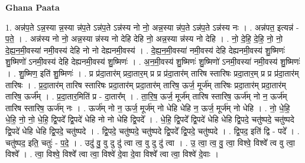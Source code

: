 \documentclass[17pt]{extarticle}
\begin{document}
\textbf{Ghana Paata } \newline

1. अन्न॑प॒ते ऽन्न॒स्या न्न॒स्या न्न॑प॒ते ऽन्न॑प॒ते ऽन्न॑स्य नो नो॒ अन्न॒स्या न्न॑प॒ते ऽन्न॑प॒ते ऽन्न॑स्य नः । . अन्न॑पत॒ इत्यन्न॑ - प॒ते॒ । . अन्न॑स्य नो नो॒ अन्न॒स्या न्न॑स्य नो देहि देहि नो॒ अन्न॒स्या न्न॑स्य नो देहि । . नो॒ दे॒हि॒ दे॒हि॒ नो॒ नो॒ दे॒ह्य॒न॒मी॒वस्या॑ नमी॒वस्य॑ देहि नो नो देह्यनमी॒वस्य॑ । . दे॒ह्य॒न॒मी॒वस्या॑ नमी॒वस्य॑ देहि देह्यनमी॒वस्य॑ शु॒ष्मिणः॑ शु॒ष्मिणो॑ ऽनमी॒वस्य॑ देहि देह्यनमी॒वस्य॑ शु॒ष्मिणः॑ । . अ॒न॒मी॒वस्य॑ शु॒ष्मिणः॑ शु॒ष्मिणो॑ ऽनमी॒वस्या॑ नमी॒वस्य॑ शु॒ष्मिणः॑ । . शु॒ष्मिण॒ इति॑ शु॒ष्मिणः॑ । . प्र प्र॑दा॒तार॑म् प्रदा॒तार॒म् प्र प्र प्र॑दा॒तार॑म् तारिष स्तारिषः प्रदा॒तार॒म् प्र प्र प्र॑दा॒तार॑म् तारिषः । . प्र॒दा॒तार॑म् तारिष स्तारिषः प्रदा॒तार॑म् प्रदा॒तार॑म् तारिष॒ ऊर्ज॒ मूर्ज॑म् तारिषः प्रदा॒तार॑म् प्रदा॒तार॑म् तारिष॒ ऊर्ज᳚म् । . प्र॒दा॒तार॒मिति॑ प्र - दा॒तार᳚म् । . ता॒रि॒ष॒ ऊर्ज॒ मूर्ज॑म् तारिष स्तारिष॒ ऊर्ज॑म् नो न॒ ऊर्ज॑म् तारिष स्तारिष॒ ऊर्ज॑म् नः । . ऊर्ज॑म् नो न॒ ऊर्ज॒ मूर्ज॑म् नो धेहि धेहि न॒ ऊर्ज॒ मूर्ज॑म् नो धेहि । . नो॒ धे॒हि॒ धे॒हि॒ नो॒ नो॒ धे॒हि॒ द्वि॒पदे᳚ द्वि॒पदे॑ धेहि नो नो धेहि द्वि॒पदे᳚ । . धे॒हि॒ द्वि॒पदे᳚ द्वि॒पदे॑ धेहि धेहि द्वि॒पदे॒ चतु॑ष्पदे॒ चतु॑ष्पदे द्वि॒पदे॑ धेहि धेहि द्वि॒पदे॒ चतु॑ष्पदे । . द्वि॒पदे॒ चतु॑ष्पदे॒ चतु॑ष्पदे द्वि॒पदे᳚ द्वि॒पदे॒ चतु॑ष्पदे । . द्वि॒पद॒ इति॑ द्वि - पदे᳚ । . चतु॑ष्पद॒ इति॒ चतुः॑ - प॒दे॒ । . उदु॑ वु॒ वु दु दु॑ त्वा त्व॒ वु दु दु॑ त्वा । . उ॒ त्वा॒ त्व॒ वु॒ त्वा॒ विश्वे॒ विश्वे᳚ त्व वु त्वा॒ विश्वे᳚ । . त्वा॒ विश्वे॒ विश्वे᳚ त्वा त्वा॒ विश्वे॑ दे॒वा दे॒वा विश्वे᳚ त्वा त्वा॒ विश्वे॑ दे॒वाः । \newline
\end{document}
